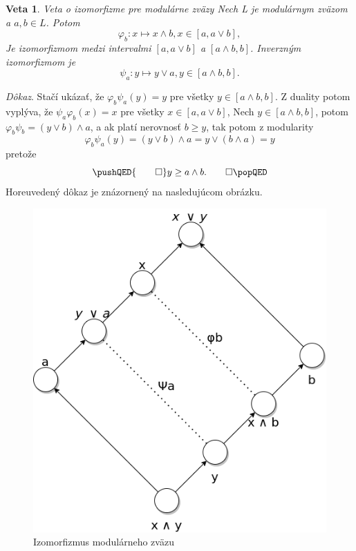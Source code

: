 \documentclass[a4paper,10pt,oneside]{report}%
\newtheorem{theorem}{Veta}[chapter]
\begin{document}
\begin{theorem} \emph{Veta o izomorfizme pre modulárne zväzy}
Nech L je modulárnym zväzom a $a, b \in L$. Potom
    \begin{equation}
        \varphi_{b}: x \mapsto x \wedge b, x \in [a, a \vee b],
    \end{equation}
Je izomorfizmom medzi intervalmi $[a, a \vee b]$ a $[ a \wedge b, b]$.
Inverzným izomorfizmom je
    \begin{equation}
        \psi_{a}: y \mapsto y \vee a, y \in [a \wedge b, b].
    \end{equation}
\end{theorem}
\emph{Dôkaz}.
    Stačí ukázať, že $\varphi_{b}\psi_{a}(y) = y$ pre všetky $y \in [a \wedge b, b]$.
    Z duality potom vyplýva, že $\psi_{a}\varphi_{b}(x) = x$ pre všetky
$x \in [a, a \vee b ]$,
    Nech $y \in [ a \wedge b, b ]$, potom $\varphi_{b}\psi_{b} = ( y \vee b ) \wedge a$,
a ak platí nerovnosť $b \geq y$, tak potom z modularity
    \begin{equation}
        \varphi_{b}\psi_{a}(y) =
        ( y \vee b ) \wedge a =
        y \vee ( b \wedge a) =
        y
    \end{equation}
    pretože
    \[
        \pushQED{\qed}
        y \geq a \wedge b. \qedhere
        \popQED
    \]
    Horeuvedený dôkaz je znázornený na nasledujúcom obrázku. 
\begin{figure}[H]
    \centering
    \includegraphics[scale=0.35]{modular_lattice_isomorphism.png}
    \caption{Izomorfizmus modulárneho zväzu}
\end{figure}
\end{document}
